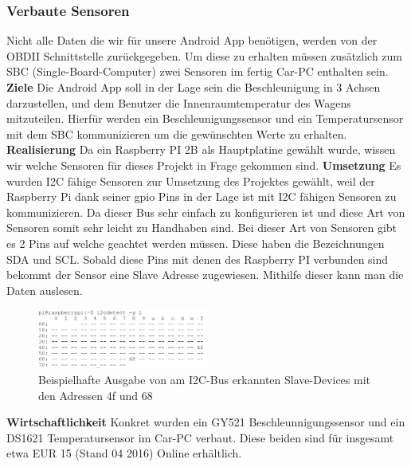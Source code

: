 \subsubsection{Verbaute Sensoren}
Nicht alle Daten die wir für unsere Android App benötigen, werden von der OBDII Schnittstelle
zurückgegeben. Um diese zu erhalten müssen zusätzlich zum SBC (Single-Board-Computer) zwei Sensoren im fertig Car-PC enthalten sein.
\nextline
\textbf{Ziele\newline}
\newline
Die Android App soll in der Lage sein die Beschleunigung in 3 Achsen darzustellen, und dem Benutzer
die Innenraumtemperatur des Wagens mitzuteilen.
Hierfür werden ein Beschleunigungssensor und ein Temperatursensor mit dem SBC kommunizieren
um die gewünschten Werte zu erhalten.
\nextline
\textbf{Realisierung\newline}
\newline
Da ein Raspberry PI 2B als Hauptplatine gewählt wurde, wissen wir welche Sensoren für dieses Projekt in Frage gekommen sind.
\nextline
\textbf{Umsetzung\newline}
\newline
Es wurden I2C fähige Sensoren zur Umsetzung des Projektes gewählt, weil der Raspberry Pi dank seiner gpio Pins in der Lage ist mit I2C fähigen Sensoren zu kommunizieren. Da dieser Bus sehr einfach zu konfigurieren ist und diese Art von Sensoren somit sehr leicht zu Handhaben sind.
Bei dieser Art von Sensoren gibt es 2 Pins auf welche geachtet werden müssen. Diese haben die Bezeichnungen SDA und SCL. Sobald diese Pins mit denen des Raspberry PI verbunden sind bekommt der Sensor eine Slave Adresse zugewiesen. Mithilfe dieser kann man die Daten auslesen.
\begin{figure}[!htb]\centering
	\includegraphics[width=0.5\textwidth]{images/sensorendetect}
	\caption{Beispielhafte Ausgabe von am I2C-Bus erkannten Slave-Devices mit den Adressen 4f und 68}\label{Fig:imgSensorDetect}
\end{figure}
\newpage
\textbf{Wirtschaftlichkeit\newline}
\newline
Konkret wurden ein GY521 Beschleunnigungssensor und ein DS1621 Temperatursensor im Car-PC verbaut. Diese beiden sind für insgesamt etwa EUR 15 (Stand 04 2016) Online erhältlich.

